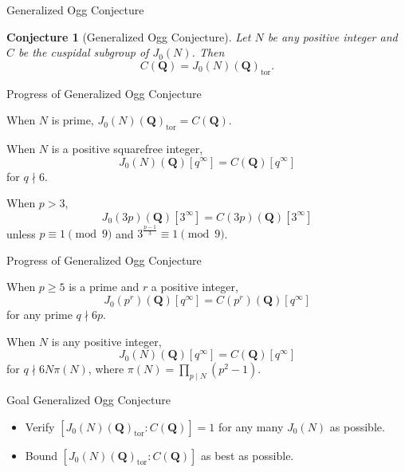 \documentclass{beamer}
\newtheorem{conjecture}[theorem]{Conjecture}
\newcommand{\QQ}{\mathbf{Q}}
\newcommand{\tor}{\mathrm{tor}}
\begin{document}
\begin{frame}{Generalized Ogg Conjecture}
    \begin{conjecture}[Generalized Ogg Conjecture]
        Let $N$ be any positive integer and $C$ be the cuspidal subgroup of
        $J_0(N)$. Then
        \[
            C(\QQ) = J_0(N)(\QQ)_\tor.
        \]
    \end{conjecture}
\end{frame}

\begin{frame}{Progress of Generalized Ogg Conjecture}

    \begin{theorem}[Mazur '77]
        When $N$ is prime, $J_0(N)(\QQ)_\tor =C(\QQ)$.
    \end{theorem}
    \begin{theorem}[Ohta '14]
        When $N$ is a positive squarefree integer,
        \[
            J_0(N)(\QQ)[q^\infty]=C(\QQ)[q^\infty]
        \]
        for $q\nmid 6$.
    \end{theorem}
    \begin{theorem}[Yoo '15]
        When $p>3$,
        \[
            J_0(3p)(\QQ)[3^\infty] = C(3p)(\QQ)[3^\infty]
        \]
        unless $p\equiv 1 \pmod{9}$ and $3^{\frac{p-1}{3}} \equiv 1
        \pmod{9}$.
    \end{theorem}
\end{frame}

\begin{frame}{Progress of Generalized Ogg Conjecture}
    \begin{theorem}[Ling '97]
        When $p\geq 5$ is a prime and $r$ a positive integer,
        \[
            J_0(p^r)(\QQ)[q^\infty] = C(p^r)(\QQ)[q^\infty]
        \]
        for any prime $q\nmid 6p$.
    \end{theorem}
    \begin{theorem}[Ren '18]
        When $N$ is any positive integer,
        \[
            J_0(N)(\QQ)[q^\infty]=C(\QQ)[q^\infty]
        \]
        for $q\nmid 6N\pi(N)$, where $\pi(N) = \prod_{p\mid N}
        (p^2-1)$.
    \end{theorem}
\end{frame}

\begin{frame}{Goal Generalized Ogg Conjecture}
    \begin{itemize}
        \item 
            Verify $[J_0(N)(\QQ)_\tor:C(\QQ)]=1$ for any many $J_0(N)$ as
            possible.
        \item
            Bound $[J_0(N)(\QQ)_\tor:C(\QQ)]$ as best as possible.
    \end{itemize}
\end{frame}
\end{document}
